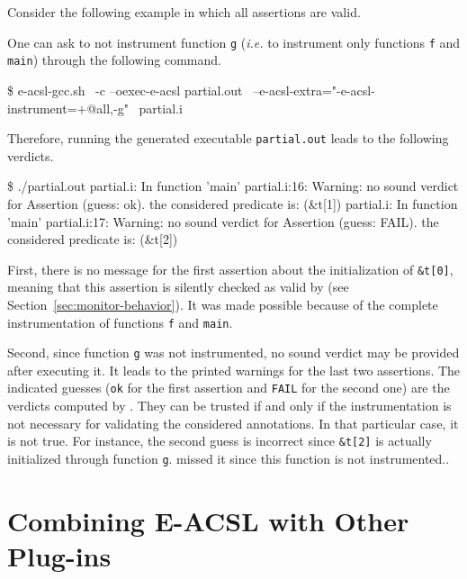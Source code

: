 Consider the following example in which all assertions are valid.


One can ask to not instrument function \texttt{g} (\emph{i.e.} to instrument
only functions \texttt{f} and \texttt{main}) through the following command.
\begin{logs}
\$ e-acsl-gcc.sh \
  -c --oexec-e-acsl partial.out \
  --e-acsl-extra="-e-acsl-instrument=+@all,-g" \
  partial.i
\end{logs}

Therefore, running the generated executable \texttt{partial.out} leads to the
following verdicts.
\begin{logs}
\$ ./partial.out
partial.i: In function 'main'
partial.i:16: Warning: no sound verdict for Assertion (guess: ok).
        the considered predicate is:
        \initialized(&t[1])
partial.i: In function 'main'
partial.i:17: Warning: no sound verdict for Assertion (guess: FAIL).
        the considered predicate is:
        \initialized(&t[2])
\end{logs}

First, there is no message for the first assertion about the initialization of
\texttt{\&t[0]}, meaning that this assertion is silently checked as valid by
\eacsl (see Section~\ref{sec:monitor-behavior}). It was made possible because of
the complete instrumentation of functions \texttt{f} and \texttt{main}.

Second, since function \texttt{g} was not instrumented, no sound verdict may be
provided after executing it. It leads to the printed warnings for the last two
assertions. The indicated guesses (\texttt{ok} for the first assertion and
\texttt{FAIL} for the second one) are the verdicts computed by \eacsl. They can
be trusted if and only if the \eacsl instrumentation is not necessary for
validating the considered annotations. In that particular case, it is not
true. For instance, the second guess is incorrect since \texttt{\&t[2]} is
actually initialized through function \texttt{g}. \eacsl missed it since this
function is not instrumented..

\section{Combining E-ACSL with Other Plug-ins} %
\label{sec:combine}

